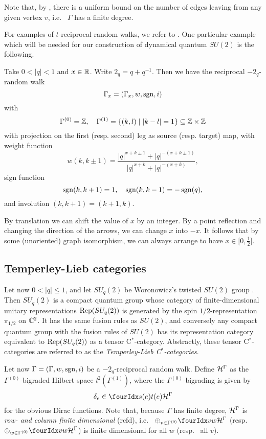 
Note that, by \cite[Proposition 3.1]{DCY1}, there is a uniform bound on the number of edges leaving from any given vertex $v$, i.e.~ $\Gamma$ has a finite degree.

For examples of $t$-reciprocal random walks, we refer to \cite{DCY1}. One particular example which will be needed for our construction of dynamical quantum $SU(2)$ is the following.

\begin{Exa}\label{ExaGraphPod} Take $0<|q|<1$ and $x\in \mathbb{R}$. Write $2_q = q+q^{-1}$. Then we have the reciprocal $-2_q$-random walk \[\Gamma_x =(\Gamma_x,w,\operatorname{\mathrm{sgn}},i)\] with \[ \Gamma^{(0)} = \mathbb{Z},\quad \Gamma^{(1)} = \{(k,l)\mid |k-l|= 1\}\subseteq \mathbb{Z}\times \mathbb{Z}\] with projection on the first (resp. second) leg as source (resp. target) map, with weight function \[w(k,k\pm 1) = \frac{|q|^{x+k\pm 1}+|q|^{-(x+k\pm 1)}}{|q|^{x+k}+|q|^{-(x+k)}},\] sign function \[\operatorname{\mathrm{sgn}}(k,k+1) = 1,\quad \operatorname{\mathrm{sgn}}(k,k-1) = -\operatorname{\mathrm{sgn}}(q),\] and involution $\overline{(k,k+1)} = (k+1,k)$. 

By translation we can shift the value of $x$ by an integer. By a point reflection and changing the direction of the arrows, we can change $x$ into $-x$. It follows that by some (unoriented) graph isomorphism, we can always arrange to have $x\in \lbrack 0,\frac{1}{2}\rbrack$.
\end{Exa} 

\subsection{Temperley-Lieb categories}

Let now $0<|q|\leq 1$, and let $SU_q(2)$ be Woronowicz's twisted $SU(2)$ group \cite{Wor1}. Then $SU_q(2)$ is a compact quantum group whose category of finite-dimensional unitary representations $\mathrm{Rep}(SU_q(2))$ is generated by the spin $1/2$-representation $\pi_{1/2}$ on $\mathbb{C}^2$. It has the same fusion rules as $SU(2)$, and conversely any compact quantum group with the fusion rules of $SU(2)$ has its representation category equivalent to $\mathrm{Rep}(SU_q(2))$ as a tensor C$^*$-category. Abstractly, these tensor C$^*$-categories are referred to as the \emph{Temperley-Lieb C$^*$-categories}.

Let now $\Gamma = (\Gamma,w,\operatorname{\mathrm{sgn}},i)$ be a $-2_q$-reciprocal random walk. Define $\mathcal{H}^{\Gamma}$ as the $\Gamma^{(0)}$-bigraded Hilbert space $l^2(\Gamma^{(1)})$, where the $\Gamma^{(0)}$-bigrading is given by \[\delta_e \in \Gru{\Hsp^{\Gamma}}{s(e)}{t(e)}\] for the obvious Dirac functions. Note that, because $\Gamma$ has finite degree, $\mathcal{H}^{\Gamma}$ is \emph{row- and column finite dimensional} (rcfd), i.e.~ $\oplus_{v\in \Gamma^{(0)}} \Gru{\Hsp^{\Gamma}}{v}{w}$ (resp.~ $\oplus_{w\in \Gamma^{(0)}} \Gru{\Hsp^{\Gamma}}{v}{w}$) is finite dimensional for all $w$ (resp.~ all $v$). 

